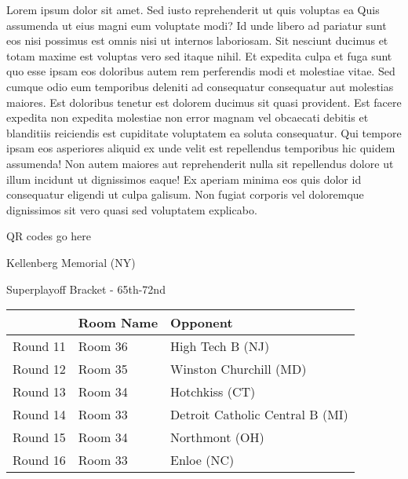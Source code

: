 \documentclass{article}%
\begin{document}
\vspace*{8pt}%
\linebreak%
\newline%
\newline%
    Lorem ipsum dolor sit amet. Sed iusto reprehenderit ut quis voluptas ea Quis assumenda ut eius magni eum voluptate modi? Id unde libero ad pariatur sunt eos nisi possimus est omnis nisi ut internos laboriosam. Sit nesciunt ducimus et totam maxime est voluptas vero sed itaque nihil. Et expedita culpa et fuga sunt quo esse ipsam eos doloribus autem rem perferendis modi et molestiae vitae.\newline%
\newline%
    Sed cumque odio eum temporibus deleniti ad consequatur consequatur aut molestias maiores. Est doloribus tenetur est dolorem ducimus sit quasi provident. Est facere expedita non expedita molestiae non error magnam vel obcaecati debitis et blanditiis reiciendis est cupiditate voluptatem ea soluta consequatur. Qui tempore ipsam eos asperiores aliquid ex unde velit est repellendus temporibus hic quidem assumenda!\newline%
\newline%
    Non autem maiores aut reprehenderit nulla sit repellendus dolore ut illum incidunt ut dignissimos eaque! Ex aperiam minima eos quis dolor id consequatur eligendi ut culpa galisum. Non fugiat corporis vel doloremque dignissimos sit vero quasi sed voluptatem explicabo.\newline%
\newline%
\vspace*{30pt}%
\begin{center}%
\begin{Huge}%
QR codes go here%
\end{Huge}%
\end{center}%
\newpage%
\begin{center}%
\begin{Huge}%
Kellenberg Memorial (NY)%
\end{Huge}%
\vspace*{8pt}%
\linebreak%
\begin{Large}%
Superplayoff Bracket {-} 65th{-}72nd%
\end{Large}%
\end{center}%
%
\begin{tabularx}{\textwidth}{|c|Y|Y|}%
\hline%
&Room Name&Opponent\\%
\hline%
Round 11&Room 36&High Tech B (NJ)\\%
Round 12&Room 35&Winston Churchill (MD)\\%
Round 13&Room 34&Hotchkiss (CT)\\%
Round 14&Room 33&Detroit Catholic Central B (MI)\\%
Round 15&Room 34&Northmont (OH)\\%
Round 16&Room 33&Enloe (NC)\\%
\hline%
\end{tabularx}%
\end{document}
